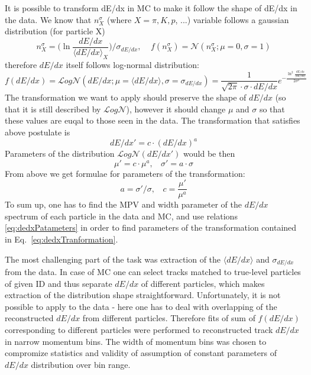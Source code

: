 It is possible to transform dE/dx in MC to make it follow the shape of dE/dx in the data. 
We know that $n^{\sigma}_{X}$ (where $X=\pi, K, p$, ...) variable follows a gaussian distribution (for particle X)
\begin{equation}n^{\sigma}_{X} = \Big( \ln{\frac{dE/dx}{\langle dE/dx\rangle_{X}}} \Big) / \sigma_{dE/dx},~~~~~f(n^{\sigma}_{X}) = \mathcal{N}(n^{\sigma}_{X}; \mu=0,\sigma=1)\end{equation}
therefore $dE/dx$ itself follows log-normal distribution:
\begin{equation}f(dE/dx) = \mathcal{L}og\mathcal{N}(dE/dx; \mu=\langle dE/dx\rangle,\sigma=\sigma_{dE/dx}) = \frac{1}{\sqrt{2\pi}\cdot \sigma\cdot dE/dx}e^{-\frac{\ln^{2}{\frac{dE/dx}{\langle dE/dx\rangle}}}{2\sigma^{2}}}\end{equation}
The transformation we want to apply should preserve the shape of $dE/dx$ (so that it is still described by $\mathcal{L}og\mathcal{N}$), however it should change $\mu$ and $\sigma$ so that these values are euqal to those seen in the data. The transformation that satisfies above postulate is
\begin{equation}dE/dx' = c\cdot (dE/dx)^{a}\label{eq:dedxTranformation}\end{equation}
Parameters of the distribution $\mathcal{L}og\mathcal{N}(dE/dx')$ would be then
\begin{equation}\mu' = c\cdot\mu^{a},~~~~\sigma' = a\cdot\sigma\end{equation}
From above we get formulae for parameters of the transformation:
\begin{equation}a=\sigma'/\sigma,~~~~c = \frac{\mu'}{\mu^{a}}\label{eq:dedxPatameters}\end{equation}%
%
To sum up, one has to find the MPV and width parameter of the $dE/dx$ spectrum of each particle in the data and MC, and use relations \eqref{eq:dedxPatameters} in order to find parameters of the transformation contained in Eq.~\eqref{eq:dedxTranformation}.

The most challenging part of the task was extraction of the $\langle dE/dx\rangle$ and $\sigma_{dE/dx}$ from the data. In case of MC one can select tracks matched to true-level particles of given ID and thus separate $dE/dx$ of different particles, which makes extraction of the distribution shape straightforward. Unfortunately, it is not possible to apply to the data - here one has to deal with overlapping of the reconstructed $dE/dx$ from different particles. Therefore fits of sum of $f(dE/dx)$ corresponding to different particles were performed to reconstructed track $dE/dx$ in narrow momentum bins. The width of momentum bins was chosen to compromize statistics and validity of assumption of constant parameters of $dE/dx$ distribution over bin range.


